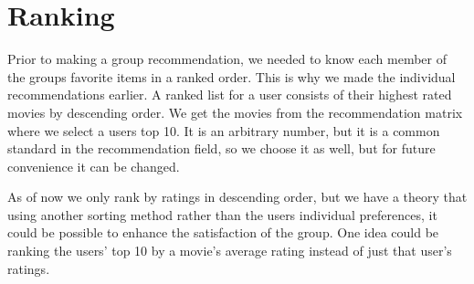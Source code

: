 \section{Ranking}\label{sec:ranking}
Prior to making a group recommendation, we needed to know each member of the groups favorite items in a ranked order. This is why we made the individual recommendations earlier. A ranked list for a user consists of their highest rated movies by descending order. We get the movies from the recommendation matrix where we select a users top 10. It is an arbitrary number, but it is a common standard in the recommendation field, so we choose it as well, but for future convenience it can be changed.

As of now we only rank by ratings in descending order, but we have a theory that using another sorting method rather than the users individual preferences, it could be possible to enhance the satisfaction of the group. One idea could be ranking the users' top 10 by a movie's average rating instead of just that user's ratings. 